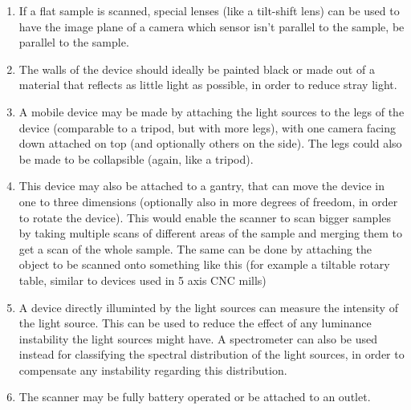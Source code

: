 \documentclass[11pt, twoside, listof=totocnumbered, bibliography=totocnumbered]{scrartcl}
\newcommand{\br}{\hfill\\}
\begin{document}
\begin{enumerate}
	\item If a flat sample is scanned, special lenses (like a tilt-shift lens) can be used to have the image plane of a camera which sensor isn't parallel to the sample, be parallel to the sample.
	\item The walls of the device should ideally be painted black or made out of a material that reflects as little light as possible, in order to reduce stray light.
	\item A mobile device may be made by attaching the light sources to the legs of the device (comparable to a tripod, but with more legs), with one camera facing down attached on top (and optionally others on the side). The legs could also be made to be collapsible (again, like a tripod).
	\item This device may also be attached to a gantry, that can move the device in one to three dimensions (optionally also in more degrees of freedom, in order to rotate the device). This would enable the scanner to scan bigger samples by taking multiple scans of different areas of the sample and merging them to get a scan of the whole sample. The same can be done by attaching the object to be scanned onto something like this (for example a tiltable rotary table, similar to devices used in 5 axis CNC mills)	
	\item A device directly illuminted by the light sources can measure the intensity of the light source. This can be used to reduce the effect of any luminance instability the light sources might have. A spectrometer can also be used instead for classifying the spectral distribution of the light sources, in order to compensate any instability regarding this distribution.
	\item The scanner may be fully battery operated or be attached to an outlet.
\end{enumerate}\br
\end{document}
